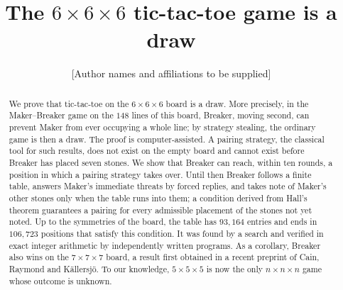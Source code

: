 \title[The $6\times6\times6$ tic-tac-toe game is a draw]{The $6\times6\times6$ tic-tac-toe game is a draw}

\author{[Author names and affiliations to be supplied]}




\begin{abstract}
We prove that tic-tac-toe on the $6\times6\times6$ board is a draw. More precisely, in the
Maker--Breaker game on the $148$ lines of this board, Breaker, moving second, can prevent Maker from ever
occupying a whole line; by strategy stealing, the ordinary game is then a draw. The proof is
computer-assisted. A pairing strategy, the classical tool for such results, does not exist on the empty
board and cannot exist before Breaker has placed seven stones. We show that Breaker can reach, within ten
rounds, a position in which a pairing strategy takes over. Until then Breaker follows a finite table,
answers Maker's immediate threats by forced replies, and takes note of Maker's other stones only when the
table runs into them; a condition derived from Hall's theorem guarantees a pairing for every admissible
placement of the stones not yet noted. Up to the symmetries of the board, the table has $93{,}164$ entries
and ends in $106{,}723$ positions that satisfy this condition. It was found by a search and verified in
exact integer arithmetic by independently written programs. As a corollary, Breaker also wins on the
$7\times7\times7$ board, a result first obtained in a recent preprint of Cain, Raymond and
K\"allersj\"o. To our knowledge, $5\times5\times5$ is now the only $n\times n\times n$ game whose outcome
is unknown.
\end{abstract}

\maketitle

\setcounter{tocdepth}{1}
\tableofcontents
